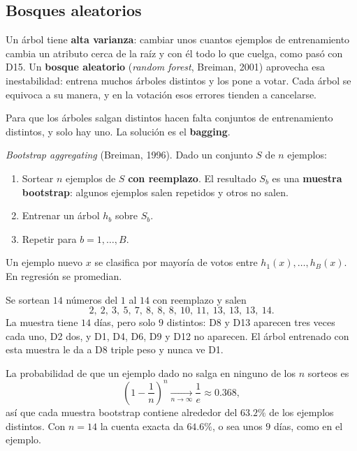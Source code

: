 \documentclass[11pt,letterpaper]{article}
\begin{document}

\subsection*{Bosques aleatorios}

Un árbol tiene \textbf{alta varianza}: cambiar unos cuantos ejemplos
de entrenamiento cambia un atributo cerca de la raíz y con él todo lo
que cuelga, como pasó con D15. Un \textbf{bosque aleatorio}
(\textit{random forest}, Breiman, 2001) aprovecha esa inestabilidad:
entrena muchos árboles distintos y los pone a votar. Cada árbol se
equivoca a su manera, y en la votación esos errores tienden a
cancelarse.

Para que los árboles salgan distintos hacen falta conjuntos de
entrenamiento distintos, y solo hay uno. La solución es el
\textbf{bagging}.

\begin{definicion}[Bagging]
    \textit{Bootstrap aggregating} (Breiman, 1996). Dado un conjunto
    $S$ de $n$ ejemplos:
    \begin{enumerate}[itemsep=0.2em]
        \item Sortear $n$ ejemplos de $S$ \textbf{con reemplazo}. El
              resultado $S_b$ es una \textbf{muestra bootstrap}: algunos
              ejemplos salen repetidos y otros no salen.
        \item Entrenar un árbol $h_b$ sobre $S_b$.
        \item Repetir para $b = 1, \dots, B$.
    \end{enumerate}
    Un ejemplo nuevo $x$ se clasifica por mayoría de votos entre
    $h_1(x), \dots, h_B(x)$. En regresión se promedian.
\end{definicion}

\begin{ejemplo}
    Se sortean $14$ números del $1$ al $14$ con reemplazo y salen
    \[
        2,\ 2,\ 3,\ 5,\ 7,\ 8,\ 8,\ 8,\ 10,\ 11,\ 13,\ 13,\ 13,\ 14 .
    \]
    La muestra tiene $14$ días, pero solo $9$ distintos: D8 y D13
    aparecen tres veces cada uno, D2 dos, y D1, D4, D6, D9 y D12 no
    aparecen. El árbol entrenado con esta muestra le da a D8 triple
    peso y nunca ve D1.
\end{ejemplo}

La probabilidad de que un ejemplo dado no salga en ninguno de los $n$
sorteos es
\[
    \left(1 - \frac{1}{n}\right)^n \xrightarrow[n \to \infty]{}
    \frac{1}{e} \approx 0.368 ,
\]
así que cada muestra bootstrap contiene alrededor del $63.2\%$ de los
ejemplos distintos. Con $n = 14$ la cuenta exacta da $64.6\%$, o sea
unos $9$ días, como en el ejemplo.
\end{document}
